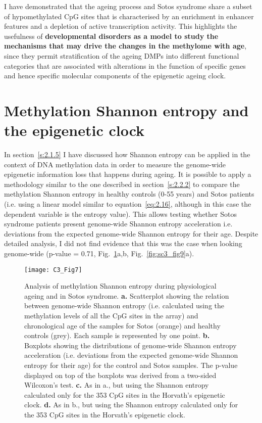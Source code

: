 \bigskip

I have demonstrated that the ageing process and Sotos syndrome share a subset of hypomethylated CpG sites that is characterised by an enrichment in enhancer features and a depletion of active transcription activity. This highlights the usefulness of \textbf{developmental disorders as a model to study the mechanisms that may drive the changes in the methylome with age}, since they permit stratification of the ageing DMPs into different functional categories that are associated with alterations in the function of specific genes and hence specific molecular components of the epigenetic ageing clock.

\smallskip

\section{Methylation Shannon entropy and the epigenetic clock}

\smallskip

In section~\ref{s:2.1.5} I have discussed how Shannon entropy can be applied in the context of DNA methylation data in order to measure the genome-wide epigenetic information loss that happens during ageing. It is possible to apply a methodology similar to the one described in section~\ref{s:2.2.2} to compare the methylation Shannon entropy in healthy controls (0-55 years) and Sotos patients (i.e. using a linear model similar to equation~\ref{eq:2.16}, although in this case the dependent variable is the entropy value). This allows testing whether Sotos syndrome patients present genome-wide Shannon entropy acceleration i.e. deviations from the expected genome-wide Shannon entropy for their age. Despite detailed analysis, I did not find evidence that this was the case when looking genome-wide (p-value = 0.71, Fig.~\ref{fig:c3_fig7}a,b, Fig.~\ref{fig:sc3_fig9}a).

\begin{figure}[htbp!] 
	\centering    
	\texttt{[image: C3\_Fig7]}
	\vspace*{1 mm}
	\caption[Methylation Shannon entropy during physiological ageing and in Sotos syndrome]{Analysis of methylation Shannon entropy during physiological ageing and in Sotos syndrome. \textbf{a.} Scatterplot showing the relation between genome-wide Shannon entropy (i.e. calculated using the methylation levels of all the CpG sites in the array) and chronological age of the samples for Sotos (orange) and healthy controls (grey). Each sample is represented by one point. \textbf{b.} Boxplots showing the distributions of genome-wide Shannon entropy acceleration (i.e. deviations from the expected genome-wide Shannon entropy for their age) for the control and Sotos samples. The p-value displayed on top of the boxplots was derived from a two-sided Wilcoxon’s test. \textbf{c.} As in a., but using the Shannon entropy calculated only for the 353 CpG sites in the Horvath's epigenetic clock. \textbf{d.} As in b., but using the Shannon entropy calculated only for the 353 CpG sites in the Horvath's epigenetic clock.}
	\label{fig:c3_fig7}
\end{figure}

